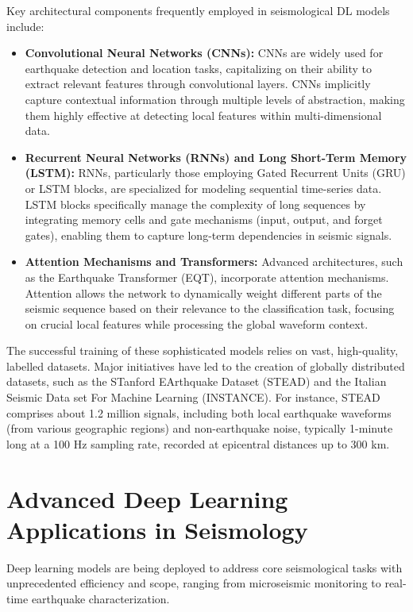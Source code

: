\documentclass[a4paper,12pt]{report}
\begin{document}
Key architectural components frequently employed in seismological DL models include:
\begin{itemize}
\item \textbf{Convolutional Neural Networks (CNNs):} CNNs are widely used for earthquake detection and location tasks, capitalizing on their ability to extract relevant features through convolutional layers. CNNs implicitly capture contextual information through multiple levels of abstraction, making them highly effective at detecting local features within multi-dimensional data.
\item \textbf{Recurrent Neural Networks (RNNs) and Long Short-Term Memory (LSTM):} RNNs, particularly those employing Gated Recurrent Units (GRU) or LSTM blocks, are specialized for modeling sequential time-series data. LSTM blocks specifically manage the complexity of long sequences by integrating memory cells and gate mechanisms (input, output, and forget gates), enabling them to capture long-term dependencies in seismic signals.
\item \textbf{Attention Mechanisms and Transformers:} Advanced architectures, such as the Earthquake Transformer (EQT), incorporate attention mechanisms. Attention allows the network to dynamically weight different parts of the seismic sequence based on their relevance to the classification task, focusing on crucial local features while processing the global waveform context.
\end{itemize}

The successful training of these sophisticated models relies on vast, high-quality, labelled datasets. Major initiatives have led to the creation of globally distributed datasets, such as the STanford EArthquake Dataset (STEAD) and the Italian Seismic Data set For Machine Learning (INSTANCE). For instance, STEAD comprises about 1.2 million signals, including both local earthquake waveforms (from various geographic regions) and non-earthquake noise, typically 1-minute long at a 100 Hz sampling rate, recorded at epicentral distances up to 300 km.
\section{Advanced Deep Learning Applications in Seismology}
\label{sec:1.3}

Deep learning models are being deployed to address core seismological tasks with unprecedented efficiency and scope, ranging from microseismic monitoring to real-time earthquake characterization.
\end{document}
